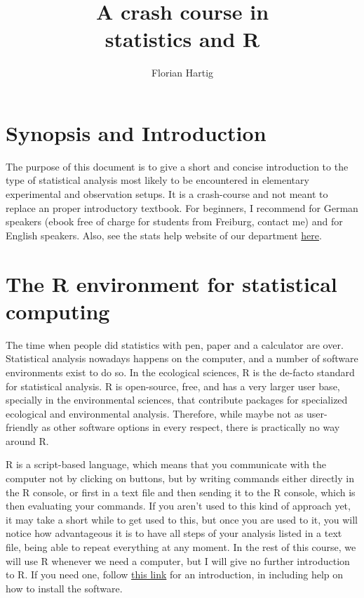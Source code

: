 \documentclass[a4paper,twoside]{tufte-book} %
\title{A crash course in\\statistics and R}
\author{Florian Hartig}
\begin{document}
\let\cleardoublepage\clearpage %
\maketitle
\newpage
\tableofcontents

\chapter{Synopsis and Introduction} %

The purpose of this document is to give a short and concise introduction to the type of statistical analysis most likely to be encountered in elementary experimental and observation setups. It is a crash-course and not meant to replace an proper introductory textbook. For beginners, I recommend \citep{Dormann-ParametrischeStatistik-2013} for German speakers (ebook free of charge for students from Freiburg, contact me) and \citep{Gotelli-PrimerEcologicalStatistics-2004} for English speakers. Also, see the stats help website of our department \href{http://biometry.github.io/APES/}{here}.
 
\chapter{The R environment for statistical computing}

The time when people did statistics with pen, paper and a calculator are over. Statistical analysis nowadays happens on the computer, and a number of software environments exist to do so. In the ecological sciences, R is the de-facto standard for statistical analysis. R is open-source, free, and has a very larger user base, specially in the environmental sciences, that contribute packages for specialized ecological and environmental analysis. Therefore, while maybe not as user-friendly as other software options in every respect, there is practically no way around R.

R is a script-based language, which means that you communicate with the computer not by clicking on buttons, but by writing commands either directly in the R console, or first in a text file and then sending it to the R console, which is then evaluating your commands. If you aren't used to this kind of approach yet, it may take a short while to get used to this, but once you are used to it, you will notice how advantageous it is to have all steps of your analysis listed in a text file, being able to repeat everything at any moment. In the rest of this course, we will use R whenever we need a computer, but I will give no further introduction to R. If you need one, follow  \href{http://biometry.github.io/APES/R/R10-gettingStarted.html}{this link} for an introduction, in including help on how to install the software.
\end{document}
